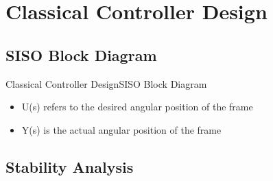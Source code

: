 
\section{Classical Controller Design}

\subsection{SISO Block Diagram}
\begin{frame}{Classical Controller Design}{SISO Block Diagram}	
	\begin{figure}
		
	\end{figure}
	\begin{itemize}
		\item U(s) refers to the desired angular position of the frame
		\item Y(s) is the actual angular position of the frame
	\end{itemize}
\end{frame}

\subsection{Stability Analysis}

